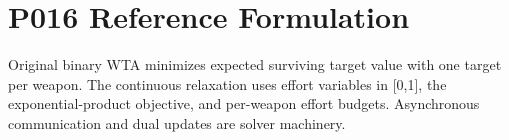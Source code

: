 \section*{P016 Reference Formulation}
Original binary WTA minimizes expected surviving target value with one target per weapon. The continuous relaxation uses effort variables in [0,1], the exponential-product objective, and per-weapon effort budgets. Asynchronous communication and dual updates are solver machinery.
